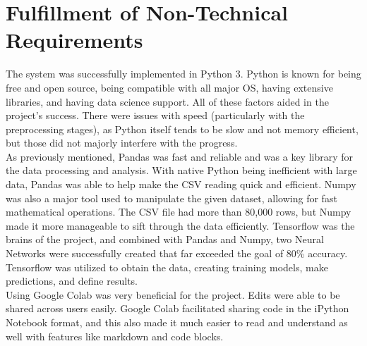 \documentclass[12pt,letterpaper,oneside,reqno]{book}
\theoremstyle{plain}
\theoremstyle{definition}
\theoremstyle{plain}
\theoremstyle{remark}
\theoremstyle{plain}
\theoremstyle{definition}
\theoremstyle{plain}
\begin{document}
\section{Fulfillment of Non-Technical Requirements}
The system was successfully implemented in Python 3. Python is known for being free and open source, being compatible with all major OS, having extensive libraries, and having data science support. All of these factors aided in the project's success. There were issues with speed (particularly with the preprocessing stages), as Python itself tends to be slow and not memory efficient, but those did not majorly interfere with the progress. \\
\indent As previously mentioned, Pandas was fast and reliable and was a key library for the data processing and analysis. With native Python being inefficient with large data, Pandas was able to help make the CSV reading quick and efficient. Numpy was also a major tool used to manipulate the given dataset, allowing for fast mathematical operations. The CSV file had more than 80,000 rows, but Numpy made it more manageable to sift through the data efficiently. Tensorflow was the brains of the project, and combined with Pandas and Numpy, two Neural Networks were successfully created that far exceeded the goal of 80\% accuracy. Tensorflow was utilized to obtain the data, creating training models, make predictions, and define results. \\
\indent Using Google Colab was very beneficial for the project. Edits were able to be shared across users easily. Google Colab facilitated sharing code in the iPython Notebook format, and this also made it much easier to read and understand as well with features like markdown and code blocks.
\end{document}
